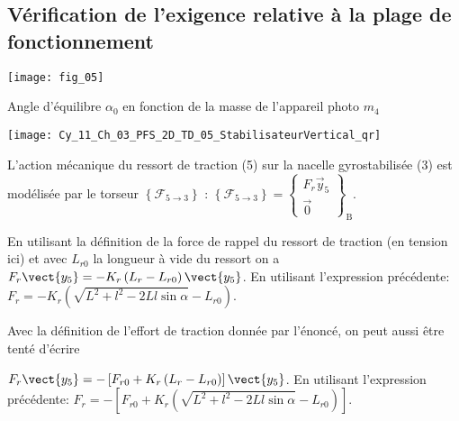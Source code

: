 \subsection*{Vérification de l'exigence relative à la plage de fonctionnement}

\begin{marginfigure}
\texttt{[image: fig\_05]}
\caption{Angle d’équilibre $\alpha_0$ en fonction de la masse de l’appareil photo $m_4$}
\label{Cy_11_Ch_03_PFS_2D_TD_05_fig_05}
\end{marginfigure}

\ifprof
\else
\begin{marginfigure}
\centering
\texttt{[image: Cy\_11\_Ch\_03\_PFS\_2D\_TD\_05\_StabilisateurVertical\_qr]}
\end{marginfigure}
\fi


\ifprof
\else
L'action mécanique du ressort de traction (5) sur la nacelle gyrostabilisée (3) est modélisée par le torseur $\left\{\mathcal{F}_{5 \rightarrow 3}\right\}$ : 
$
\left\{\mathcal{F}_{5 \rightarrow 3}\right\}=\left\{\begin{array}{c}
F_{r} \vec{y}_{5} \\
\overrightarrow{0}
\end{array}\right\}_{\mathrm{B}} .
$
\fi



\ifprof
\else
\ifcolle \else
{}
\fi\fi

\ifprof
\begin{corrige}
En utilisant la définition de la force de rappel du ressort de traction (en tension ici) et  avec $L_{r0}$ la longueur à vide du ressort on a $F_r\vect{y_5}=-K_r\left(L_r-L_{r0}\right)\vect{y_5}$. En utilisant l'expression précédente:
 $\boxed{F_r=-K_r\left(\sqrt{L^2+l^2-2Ll\sin\alpha}-L_{r0}\right)}$.

Avec la définition de l'effort de traction donnée par l'énoncé, on peut aussi être tenté d'écrire 

$F_r\vect{y_5}=-\left[ F_{r0} + K_r\left(L_r-L_{r0}\right)\right]\vect{y_5}$. En utilisant l'expression précédente:
$\boxed{F_r=-\left[F_{r0} + K_r\left(\sqrt{L^2+l^2-2Ll\sin\alpha}-L_{r0}\right)\right]}$.
\end{corrige}
\else
\fi

